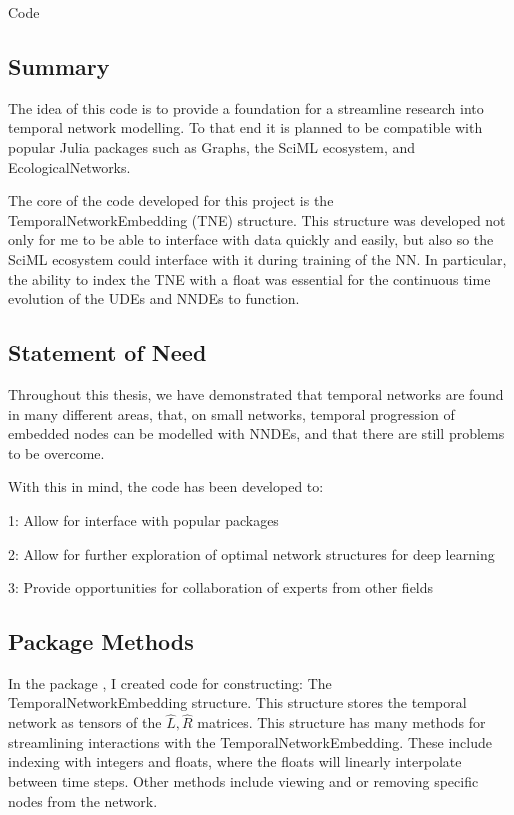 \documentclass[12pt]{amsart}
\begin{document}

\begin{section}{Code}
    \subsection{Summary}
        The idea of this code is to provide a foundation for a streamline research into temporal network modelling. To that end it is planned to be compatible with popular Julia packages such as Graphs, the SciML ecosystem, and EcologicalNetworks.

        The core of the code developed for this project is the TemporalNetworkEmbedding (TNE) structure. This structure was developed not only for me to be able to interface with data quickly and easily, but also so the SciML ecosystem could interface with it during training of the NN. In particular, the ability to index the TNE with a float was essential for the continuous time evolution of the UDEs and NNDEs to function.

    \subsection{Statement of Need}
        Throughout this thesis, we have demonstrated that temporal networks are found in many different areas, that, on small networks, temporal progression of embedded nodes can be modelled with NNDEs, and that there are still problems to be overcome. 

        With this in mind, the code has been developed to:

            1: Allow for interface with popular packages

            2: Allow for further exploration of optimal network structures for deep learning

            3: Provide opportunities for collaboration of experts from other fields

    \subsection{Package Methods}
        In the package \cite{DotProductGraphs}, I created code for constructing:
        The TemporalNetworkEmbedding structure. This structure stores the temporal network as tensors of the $\hat L, \hat R$ matrices. This structure has many methods for streamlining interactions with the TemporalNetworkEmbedding. These include indexing with integers and floats, where the floats will linearly interpolate between time steps. Other methods include viewing and or removing specific nodes from the network.
        

\end{section}
\end{document}

